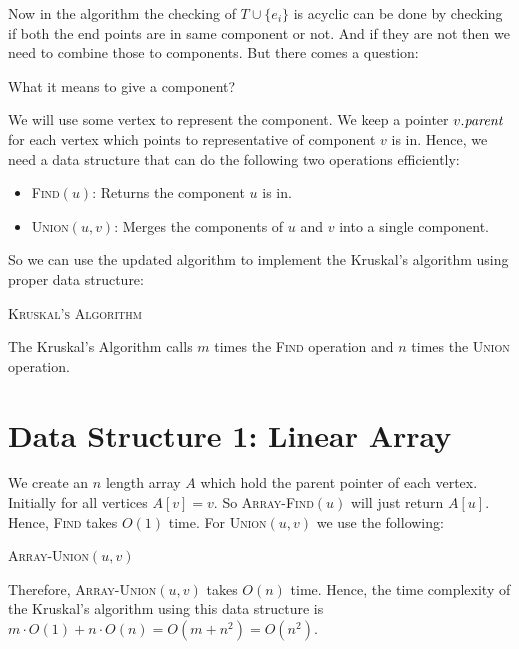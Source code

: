 Now in the algorithm the checking of $T\cup \{e_i\}$ is acyclic can be done by checking if both the end points are in same component or not. And if they are not then we need to combine those to components. But there comes a question:
\begin{question}{}{}
	What it means to give a component?
\end{question}
We will use some vertex to represent the component. We keep a pointer $v.\emph{parent}$ for each vertex which points to representative of component $v$ is in. Hence, we need a data structure that can do the following two operations efficiently:
\begin{itemize}[label=$\bullet$]
	\item \textsc{Find}$(u)$: Returns the component $u$ is in.
	\item \textsc{Union}$(u,v)$: Merges the components of $u$ and $v$ into a single component.
\end{itemize}
So we can use the updated algorithm to implement the Kruskal's algorithm  using proper data structure:
\begin{algorithm}[]
	\caption{\textsc{Kruskal's Algorithm}}
	\DontPrintSemicolon
\end{algorithm}
The Kruskal's Algorithm calls $m$ times the \textsc{Find} operation and $n$ times the \textsc{Union} operation.
\section{Data Structure 1: Linear Array}
We create an $n$ length array $A$ which hold the parent pointer of each vertex. Initially for all vertices $A[v]=v$. So \textsc{Array-Find}$(u)$ will just return $A[u]$. Hence, \textsc{Find} takes $O(1)$ time. For \textsc{Union}$(u,v)$ we use the following:
\begin{algorithm}[]
	\caption{\textsc{Array-Union}$(u,v)$}
	\DontPrintSemicolon
\end{algorithm}
Therefore, \textsc{Array-Union}$(u,v)$ takes $O(n)$ time. Hence, the time complexity of the Kruskal's algorithm using this data structure is $m\cdot O(1)+n\cdot O(n)=O(m+n^2)=O(n^2)$.
